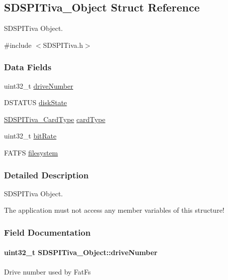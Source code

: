 \subsection{S\-D\-S\-P\-I\-Tiva\-\_\-\-Object Struct Reference}
\label{struct_s_d_s_p_i_tiva___object}


S\-D\-S\-P\-I\-Tiva Object.  




{\ttfamily \#include $<$S\-D\-S\-P\-I\-Tiva.\-h$>$}

\subsubsection*{Data Fields}
\begin{DoxyCompactItemize}
\item 
uint32\-\_\-t \hyperlink{struct_s_d_s_p_i_tiva___object_a60316454bfd57a20cbcf2d3f13f4f617}{drive\-Number}
\item 
D\-S\-T\-A\-T\-U\-S \hyperlink{struct_s_d_s_p_i_tiva___object_ad6d1084d70028145483de412f3214e4b}{disk\-State}
\item 
\hyperlink{_s_d_s_p_i_tiva_8h_a735a3f0fb087ca4e97c2e43ed68b1a0a}{S\-D\-S\-P\-I\-Tiva\-\_\-\-Card\-Type} \hyperlink{struct_s_d_s_p_i_tiva___object_aff179e7ccea883efed7d8d16f6fd9917}{card\-Type}
\item 
uint32\-\_\-t \hyperlink{struct_s_d_s_p_i_tiva___object_a1cd6cec603b463bb38884ca6b0f939cc}{bit\-Rate}
\item 
F\-A\-T\-F\-S \hyperlink{struct_s_d_s_p_i_tiva___object_a64192599a4d272f2b931c5f8a42df808}{filesystem}
\end{DoxyCompactItemize}


\subsubsection{Detailed Description}
S\-D\-S\-P\-I\-Tiva Object. 

The application must not access any member variables of this structure! 

\subsubsection{Field Documentation}
\paragraph[{drive\-Number}]{\setlength{\rightskip}{0pt plus 5cm}uint32\-\_\-t S\-D\-S\-P\-I\-Tiva\-\_\-\-Object\-::drive\-Number}\label{struct_s_d_s_p_i_tiva___object_a60316454bfd57a20cbcf2d3f13f4f617}
Drive number used by Fat\-Fs 
